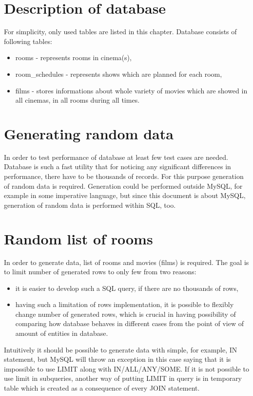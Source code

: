 \documentclass[10pt,a4paper]{article}
\begin{document}
\section{Description of database}
For simplicity, only used tables are listed in this chapter. 
Database consists of following tables: 
\begin {itemize}
\item rooms - represents rooms in cinema(s), 
\item room\_schedules - represents shows which are planned for each room, 
\item films - stores informations about whole variety of movies which are showed in all cinemas, in all rooms during all times. 
\end {itemize}

\section{Generating random data}
In order to test performance of database at least few test cases are needed. Database is such a fast utility that for noticing any significant differences in performance, there have to be thousands of records. For this purpose generation of random data is required. 
Generation could be performed outside MySQL, for example in some imperative language, but since this document is about MySQL, generation of random data is performed within SQL, too.  

\section{Random list of rooms}

In order to generate data, list of rooms and movies (films) is required. The goal is to limit number of generated rows to only few from two reasons: 
\begin{itemize}
\item it is easier to develop such a SQL query, if there are no thousands of rows, 
\item having such a limitation of rows implementation, it is possible to flexibly change number of generated rows, which is crucial in having possibility of comparing how database behaves in different cases from the point of view of amount of entities in database. 
\end{itemize}
Intuitively it should be possible to generate data with simple, for example, IN statement, but MySQL will throw an exception in this case saying that it is impossible to use LIMIT along with IN/ALL/ANY/SOME. If it is not possible to use limit in subqueries, another way of putting LIMIT in query is in temporary table which is created as a consequence of every JOIN statement. 
\end{document}
